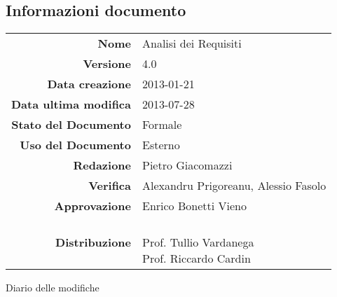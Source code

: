 \newcommand{\Versione}{4.0}%
\newcommand{\Data}{2013-01-21}%
\newcommand{\TipoDocumento}{Analisi dei Requisiti}

\newcommand{\json}{JSON}
\newcommand{\treds}{3DS}
\newcommand{\xml}{XML}
\newcommand{\obj}{OBJ}
\newcommand{\mtl}{MTL}



\begin{abstract}
\begin{center}
Questo documento si propone di presentare l'analisi dei requisiti che il prodotto \textbf{3DMob} dovrà rispettare, individuati a partire dal capitolato d'appalto del Proponente \Prop{}
\end{center}
\end{abstract}
\begin{center}
\vspace{.0in}
\section*{\\Informazioni documento}
\begin{tabular}{r|l}
\textbf{Nome} &\TipoDocumento \\%
\textbf{Versione} & \Versione\\
\textbf{Data creazione} & 2013-01-21\\
\textbf{Data ultima modifica} & 2013-07-28 \\%
\textbf{Stato del Documento} & Formale \\%
\textbf{Uso del Documento} & Esterno \\%
\textbf{Redazione} & Pietro Giacomazzi\\
\textbf{Verifica} & Alexandru Prigoreanu, Alessio Fasolo\\
\textbf{Approvazione} & Enrico Bonetti Vieno\\%
\textbf{Distribuzione} & \parbox[t]{4cm}{\NomeGruppo{} \\ Prof. Tullio Vardanega \\ Prof. Riccardo Cardin \\ \Prop{} }\\
\end{tabular}
\end{center}
\vspace{.4in}


%
\newpage
Diario delle modifiche

